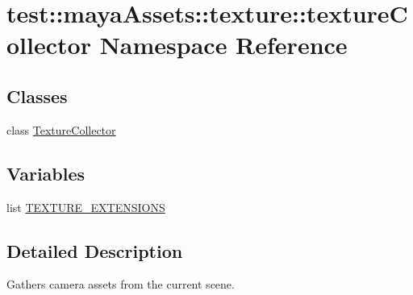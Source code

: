 \hypertarget{namespacetest_1_1mayaAssets_1_1texture_1_1textureCollector}{\section{test\-:\-:maya\-Assets\-:\-:texture\-:\-:texture\-Collector \-Namespace \-Reference}
\label{dc/d6f/namespacetest_1_1mayaAssets_1_1texture_1_1textureCollector}
}
\subsection*{\-Classes}
\begin{DoxyCompactItemize}
\item 
class \hyperlink{classtest_1_1mayaAssets_1_1texture_1_1textureCollector_1_1TextureCollector}{\-Texture\-Collector}
\end{DoxyCompactItemize}
\subsection*{\-Variables}
\begin{DoxyCompactItemize}
\item 
list \hyperlink{namespacetest_1_1mayaAssets_1_1texture_1_1textureCollector_a0fd5dad17efa7fba535d8811b6c4c6b9}{\-T\-E\-X\-T\-U\-R\-E\-\_\-\-E\-X\-T\-E\-N\-S\-I\-O\-N\-S}
\end{DoxyCompactItemize}


\subsection{\-Detailed \-Description}
\begin{DoxyVerb}
Gathers camera assets from the current scene.
\end{DoxyVerb}
 


